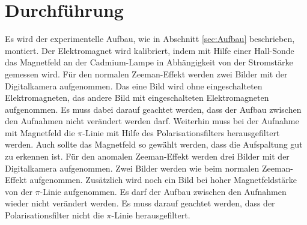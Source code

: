 
\section{Durchführung}
\label{sec:Durchführung}
Es wird der experimentelle Aufbau, wie in Abschnitt \ref{sec:Aufbau} beschrieben, montiert. Der Elektromagnet wird kalibriert, indem mit Hilfe einer Hall-Sonde das Magnetfeld an der Cadmium-Lampe in Abhängigkeit von der Stromstärke gemessen wird. Für den normalen Zeeman-Effekt werden zwei Bilder mit der Digitalkamera aufgenommen. Das eine Bild wird ohne eingeschalteten Elektromagneten, das andere Bild mit eingeschalteten Elektromagneten aufgenommen. Es muss dabei darauf geachtet werden, dass der Aufbau zwischen den Aufnahmen nicht verändert werden darf. Weiterhin muss bei der Aufnahme mit Magnetfeld die $\pi$-Linie mit Hilfe des Polarisationsfilters herausgefiltert werden. Auch sollte das Magnetfeld so gewählt werden, dass die Aufspaltung gut zu erkennen ist. Für den anomalen Zeeman-Effekt werden drei Bilder mit der Digitalkamera aufgenommen. Zwei Bilder werden wie beim normalen Zeeman-Effekt aufgenommen. Zusätzlich wird noch ein Bild bei hoher Magnetfeldstärke von der $\pi$-Linie aufgenommen. Es darf der Aufbau zwischen den Aufnahmen wieder nicht verändert werden. Es muss darauf geachtet werden, dass der Polarisationsfilter nicht die $\pi$-Linie herausgefiltert.
